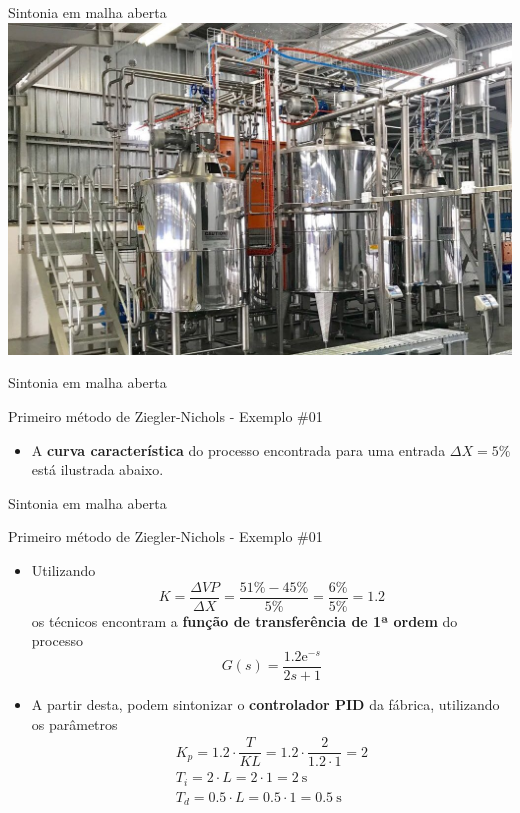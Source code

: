 \begin{frame}{Sintonia em malha aberta}
	\centering
	\includegraphics[width=0.9\linewidth]{Figuras/Ch14/fig6n2}
\end{frame}


\begin{frame}{Sintonia em malha aberta}
	\begin{block}{Primeiro método de Ziegler-Nichols - Exemplo \#01}
		\begin{itemize}
			\item A \textbf{curva característica} do processo encontrada para uma entrada $ \Delta X=5\% $ está ilustrada abaixo.
		\end{itemize}
	\end{block}
	
	\centering
	\scalebox{1.3}{}
	
\end{frame}


\begin{frame}{Sintonia em malha aberta}
	\begin{block}{Primeiro método de Ziegler-Nichols - Exemplo \#01}
		\begin{itemize}
			\item Utilizando \[ K=\dfrac{\Delta VP}{\Delta X}=\dfrac{51\%-45\%}{5\%}=\dfrac{6\%}{5\%}=\num{1.2} \]
			os técnicos encontram a \textbf{função de transferência de 1ª ordem} do processo \[ G(s)=\dfrac{\num{1.2}
				\text{e}^{-s}}{2s+1} \]
			\item A partir desta, podem sintonizar o \textbf{controlador PID} da fábrica, utilizando os parâmetros
			\begin{gather*}
			K_p=\num{1.2}\cdot\dfrac{T}{KL}=\num{1,2}\cdot\dfrac{2}{\num{1.2}\cdot1}=2\\
			T_i=2\cdot L=2\cdot1=\SI{2}{\second}\\
			T_d=\num{0.5}\cdot L=\num{0.5}\cdot1=\SI{0.5}{\second}
			\end{gather*}
		\end{itemize}
	\end{block}
\end{frame}


